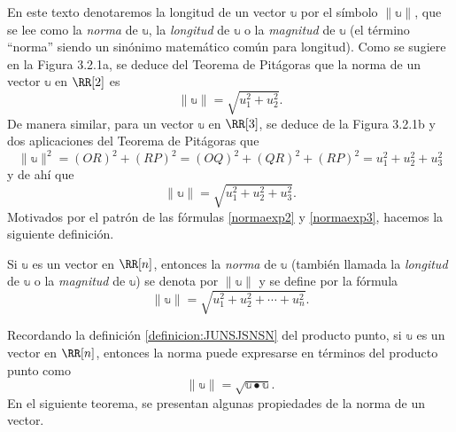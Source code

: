 En este texto denotaremos la longitud de un vector $\mathbb{u}$ por el símbolo $\|\mathbb{u}\|$, que se lee como la \emph{norma} de $\mathbb{u}$, la \emph{longitud} de $\mathbb{u}$ o la \emph{magnitud} de $\mathbb{u}$ (el término “norma” siendo un sinónimo matemático común para longitud). Como se sugiere en la Figura 3.2.1a, se deduce del Teorema de Pitágoras que la norma de un vector $\mathbb{u}$ en $\RR[2]$ es
\begin{equation}
    \|\mathbb{u}\| = \sqrt{u_1^2 + u_2^2}. \label{normaexp2}
\end{equation}
De manera similar, para un vector $\mathbb{u}$ en $\RR[3]$, se deduce de la Figura 3.2.1b y dos aplicaciones del Teorema de Pitágoras que
$$\|\mathbb{u}\|^2 = (OR)^2 + (RP)^2 = (OQ)^2 + (QR)^2 + (RP)^2 = u_1^2 + u_2^2 + u_3^2$$
y de ahí que
\begin{equation}
    \|\mathbb{u}\| = \sqrt{u_1^2 + u_2^2 + u_3^2}. \label{normaexp3}
\end{equation}
Motivados por el patrón de las fórmulas \eqref{normaexp2} y \eqref{normaexp3}, hacemos la siguiente definición.

\begin{definicion}{}{}
    Si $\mathbb{u}$ es un vector en $\RR[n]$, entonces la \emph{norma} de $\mathbb{u}$ (también llamada la \emph{longitud} de $\mathbb{u}$ o la \emph{magnitud} de $\mathbb{u}$) se denota por $\|\mathbb{u}\|$ y se define por la fórmula
    $$\|\mathbb{u}\| = \sqrt{u_1^2 + u_2^2 + \cdots + u_n^2}.$$
\end{definicion}

Recordando la definición \ref{definicion:JUNSJSNSN} del producto punto, si $\mathbb{u}$ es un vector en $\RR[n]$, entonces la norma puede expresarse en términos del producto punto como
$$\|\mathbb{u}\| = \sqrt{\mathbb{u} \bullet \mathbb{u}}.$$
En el siguiente teorema, se presentan algunas propiedades de la norma de un vector.

